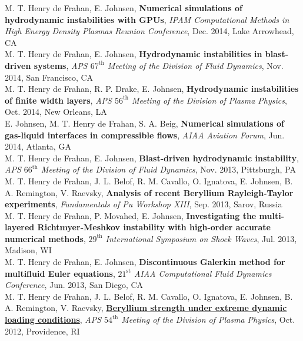 \documentclass[11pt,letterpaper]{article}
\begin{document}
M. T. Henry de Frahan, E. Johnsen, \textbf{Numerical simulations of hydrodynamic instabilities with GPUs}, \textit{IPAM Computational Methods in High Energy Density Plasmas Reunion Conference}, Dec. 2014, Lake Arrowhead, CA\\[2ex]%
M. T. Henry de Frahan, E. Johnsen, \textbf{Hydrodynamic instabilities in blast-driven systems}, \textit{APS $67^{\text{th}}$ Meeting of the Division of Fluid Dynamics}, Nov. 2014, San Francisco, CA\\[2ex]%
M. T. Henry de Frahan, R. P. Drake, E. Johnsen, \textbf{Hydrodynamic instabilities of finite width layers}, \textit{APS ${56^{\text{th}}}$ Meeting of the Division of Plasma Physics}, Oct. 2014, New Orleans, LA\\[2ex]%
E. Johnsen, M. T. Henry de Frahan, S. A. Beig, \textbf{Numerical simulations of gas-liquid interfaces in compressible flows}, \textit{AIAA Aviation Forum}, Jun. 2014, Atlanta, GA\\[2ex]%
M. T. Henry de Frahan, E. Johnsen, \textbf{Blast-driven hydrodynamic instability}, \textit{APS $66^{\text{th}}$ Meeting of the Division of Fluid Dynamics}, Nov. 2013, Pittsburgh, PA\\[2ex]%
M. T. Henry de Frahan, J. L. Belof, R. M. Cavallo, O. Ignatova, E. Johnsen, B. A. Remington, V. Raevsky, \textbf{Analysis of recent Beryllium Rayleigh-Taylor experiments}, \textit{Fundamentals of Pu Workshop XIII}, Sep. 2013, Sarov, Russia\\[2ex]%
M. T. Henry de Frahan, P. Movahed, E. Johnsen, \textbf{Investigating the multi-layered Richtmyer-Meshkov instability with high-order accurate numerical methods}, \textit{$29^{\text{th}}$ International Symposium on Shock Waves}, Jul. 2013, Madison, WI\\[2ex]%
M. T. Henry de Frahan, E. Johnsen, \textbf{Discontinuous Galerkin method for multifluid Euler equations}, \textit{$21^{\text{st}}$ AIAA Computational Fluid Dynamics Conference}, Jun. 2013, San Diego, CA\\[2ex]%
M. T. Henry de Frahan, J. L. Belof, R. M. Cavallo, O. Ignatova, E. Johnsen, B. A. Remington, V. Raevsky, \href{http://meeting.aps.org/Meeting/DPP12/Event/176052}{\textbf{Beryllium strength under extreme dynamic loading conditions}}, \textit{APS $54^{\text{th}}$ Meeting of the Division of Plasma Physics}, Oct. 2012, Providence, RI\\[3ex]%
\end{document}

